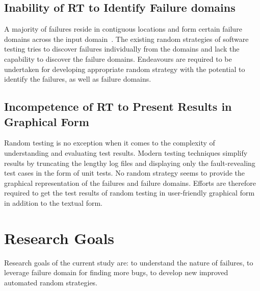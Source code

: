 \subsection{Inability of RT to Identify Failure domains}
A majority of failures reside in contiguous locations and form certain failure domains across the input domain~\cite{chan1996proportional}. The existing random strategies of software testing tries to discover failures individually from the domains and lack the capability to discover the failure domains. Endeavours are required to be undertaken for developing appropriate random strategy with the potential to identify the failures, as well as failure domains. 


\subsection{Incompetence of RT to Present Results in Graphical Form}
Random testing is no exception when it comes to the complexity of understanding and evaluating test results. Modern testing techniques simplify results by truncating the lengthy log files and displaying only the fault-revealing test cases in the form of unit tests. No random strategy seems to provide the graphical representation of the failures and failure domains. Efforts are therefore required to get the test results of random testing in user-friendly graphical form in addition to the textual form. 






\section{Research Goals}\label{ResearchGoals_1}
Research goals of the current study are: to understand the nature of failures, to leverage failure domain for finding more bugs, to develop new improved automated random strategies.

